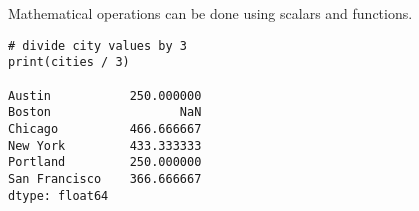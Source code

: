 \begin{frame}[fragile]
Mathematical operations can be done using scalars and functions.
\begin{lstlisting}
# divide city values by 3
print(cities / 3)

Austin           250.000000
Boston                  NaN
Chicago          466.666667
New York         433.333333
Portland         250.000000
San Francisco    366.666667
dtype: float64
\end{lstlisting}
\end{frame}

%

%
%
%


